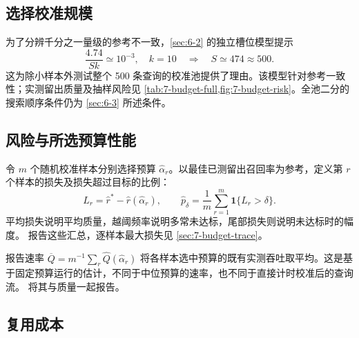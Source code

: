 \subsection{选择校准规模}

为了分辨千分之一量级的参考不一致，\cref{sec:6-2} 的独立槽位模型提示
\[
 \frac{4.74}{Sk}\simeq10^{-3},\quad k=10
 \quad\Longrightarrow\quad S\simeq474\approx500.
\]
这为除小样本外测试整个 500 条查询的校准池提供了理由。该模型针对参考一致性；实测留出质量及抽样风险见 \cref{tab:7-budget-full,fig:7-budget-risk}。全池二分的搜索顺序条件仍为 \cref{sec:6-3} 所述条件。

\subsection{风险与所选预算性能}

令 $m$ 个随机校准样本分别选择预算 $\widehat\alpha_r$。以最佳已测留出召回率为参考，定义第 $r$ 个样本的损失及损失超过目标的比例：
\begin{equation}
 L_r=\widehat r^*-\widehat r(\widehat\alpha_r),\qquad
 \widehat p_\delta=\frac{1}{m}\sum_{r=1}^{m}\mathbf1\{L_r>\delta\}.
 \label{eq:6-risk}
\end{equation}
平均损失说明平均质量，越阈频率说明多常未达标，尾部损失则说明未达标时的幅度。 报告这些汇总，逐样本最大损失见 \cref{sec:7-budget-trace}。

报告速率 $\overline Q=m^{-1}\sum_r\widehat Q(\widehat\alpha_r)$ 将各样本选中预算的既有实测吞吐取平均。这是基于固定预算运行的估计，不同于中位预算的速率，也不同于直接计时校准后的查询流。 将其与质量一起报告。

\subsection{复用成本}

